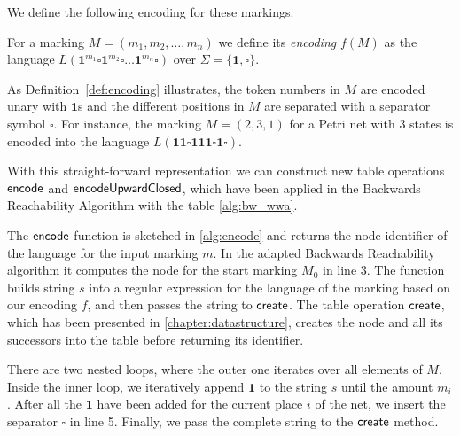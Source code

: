 \par 

We define the following encoding for these markings.

\begin{definition}\label{def:encoding}
For a marking $M = (m_{1},m_{2},\dots,m_{n})$ we define its \emph{encoding} $f(M)$ as the language $L(\bm{1}^{m_{1}} \square \bm{1}^{m_{2}} \square \ldots \bm{1}^{m_{n}} \square)$ over $\Sigma = \{\bm{1}, \square\}$.
\end{definition}


As Definition~\autoref{def:encoding} illustrates, the token numbers in $M$ are encoded unary with $\bm{1}$s and the different positions in $M$ are separated with a separator symbol $\square$. For instance, the marking $M = (2,3,1)$ for a Petri net with 3 states is encoded into the language $L(\bm{11 \square 111 \square 1 \square})$. 
\par 
With this straight-forward representation we can construct new table operations $\operatorname{\textsf{encode}}$ and $\operatorname{\textsf{encodeUpwardClosed}}$, which have been applied in the Backwards Reachability Algorithm with the table \autoref{alg:bw_wwa}. 
\par
The $\operatorname{\textsf{encode}}$ function is sketched in \autoref{alg:encode} and returns the node identifier of the language for the input marking $m$. In the adapted Backwards Reachability algorithm it computes the node for the start marking $M_{0}$ in line 3. The function builds string $s$ into a regular expression for the language of the marking based on our encoding $f$, and then passes the string to $\operatorname{\textsf{create}}$. The table operation $\operatorname{\textsf{create}}$, which has been presented in \autoref{chapter:datastructure}, creates the node and all its successors into the table before returning its identifier.

\par
There are two nested loops, where the outer one iterates over all elements of $M$. Inside the inner loop, we iteratively append $\bm{1}$ to the string $s$ until the amount $m_{i}$. After all the $\bm{1}$ have been added for the current place $i$ of the net, we insert the separator $\square$ in line 5.
Finally, we pass the complete string to the $\operatorname{\textsf{create}}$ method. 

